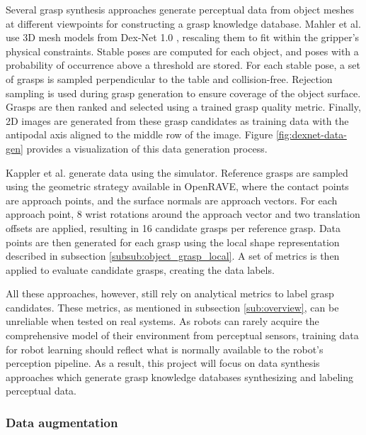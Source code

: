Several grasp synthesis approaches generate perceptual data from object meshes at different viewpoints
\cite{mahler2017,Gualtieri2016,Kappler2015} for constructing a grasp knowledge database. Mahler et al. \cite{mahler2017}
use 3D mesh models from Dex-Net 1.0 \cite{mahler2016}, rescaling them to fit within the gripper's physical constraints.
Stable poses are computed for each object, and poses with a probability of occurrence above a threshold are stored.
For each stable pose, a set of grasps is sampled perpendicular to the table and collision-free. Rejection sampling
is used during grasp generation to ensure coverage of the object surface. Grasps are then ranked and selected using
a trained grasp quality metric. Finally, 2D images are generated from these grasp candidates as training data with the
antipodal axis aligned to the middle row of the image. Figure \ref{fig:dexnet-data-gen} provides a visualization of this
data generation process.

Kappler et al. \cite{Kappler2015} generate data using the 
\cite{Diankov2010} simulator. Reference grasps are sampled using the geometric strategy available in OpenRAVE, where the
contact points are approach points, and the surface normals are approach vectors. For each approach point, 8 wrist
rotations around the approach vector and two translation offsets are applied, resulting in 16 candidate grasps per
reference grasp. Data points are then generated for each grasp using the local shape representation described in
subsection \ref{subsub:object_grasp_local}. A set of metrics is then applied to evaluate candidate grasps, creating the
data labels.

All these approaches, however, still rely on analytical metrics to label grasp candidates. These metrics, as mentioned
in subsection \ref{sub:overview}, can be unreliable when tested on real systems. As robots can rarely acquire the
comprehensive model of their environment from perceptual sensors, training data for robot learning should reflect what
is normally available to the robot's perception pipeline. As a result, this project will focus on data synthesis
approaches which generate grasp knowledge databases synthesizing and labeling perceptual data.

\subsubsection{Data augmentation}

